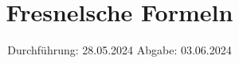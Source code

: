 

\subject{v407}
\title{Fresnelsche Formeln}
\date{%
  Durchführung: 28.05.2024
  \hspace{3em}
  Abgabe: 03.06.2024
}



\maketitle
\thispagestyle{empty}
\tableofcontents
\newpage






\printbibliography{}

